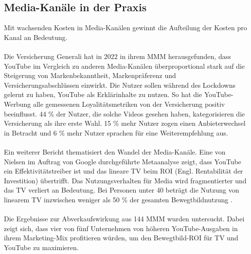 \subsection{Media-Kanäle in der Praxis}
Mit wachsenden Kosten in Media-Kanälen gewinnt die Aufteilung der Kosten pro Kanal an Bedeutung. \\\\
Die Versicherung Generali hat in 2022 in ihrem \ac{MMM} herausgefunden, dass YouTube im Vergleich zu anderen Media-Kanälen überproportional stark auf die Steigerung von Markenbekanntheit, Markenpräferenz und Versicherungsabschlüssen einwirkt\cite{DasZusammenspielKundenloyalität2022}. Die Nutzer sollen während des Lockdowns gelernt zu haben, YouTube als Erklärinhalte zu nutzen. So hat die YouTube-Werbung alle gemessenen Loyalitätsmetriken von der Versicherung positiv beeinflusst. 44 \% der Nutzer, die solche Videos gesehen haben, kategorisieren die Versicherung als ihre erste Wahl. 15 \% mehr Nutzer zogen einen Anbieterwechsel in Betracht und 6 \% mehr Nutzer sprachen für eine Weiterempfehlung aus\cite{DasZusammenspielKundenloyalität2022}. \\\\
Ein weiterer Bericht thematisiert den Wandel der Media-Kanäle. Eine von Nielsen im Auftrag von Google durchgeführte Metaanalyse zeigt, dass YouTube ein Effektivitätstreiber ist und das lineare TV beim \ac{ROI} (Engl. Rentabilität der Investition) übertrifft. Das Nutzungsverhalten für Media wird fragmentierter und das TV verliert an Bedeutung. Bei Personen unter 40 beträgt die Nutzung von linearem TV inzwischen weniger als 50 \% der gesamten Bewegtbildnutzung \cite{237097}.\\\\
Die Ergebnisse zur Abverkaufswirkung aus 144 \ac{MMM} wurden untersucht. Dabei zeigt sich, dass vier von fünf Unternehmen von höheren YouTube-Ausgaben in ihrem Marketing-Mix profitieren würden, um den Bewegtbild-ROI für TV und YouTube zu maximieren\cite{237097}. \\\\

